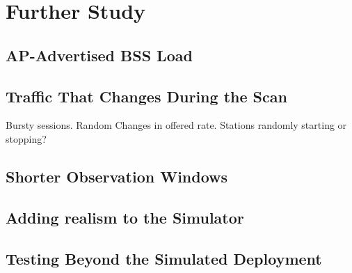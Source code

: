 \documentclass[conference]{IEEEtran}
\begin{document}
\section{Further Study}
\label{sec:future}

\subsection{AP-Advertised BSS Load}

\subsection{Traffic That Changes During the Scan}

Bursty sessions. Random Changes in offered rate. Stations randomly starting or stopping?

\subsection{Shorter Observation Windows}

\subsection{Adding realism to the Simulator}

\subsection{Testing Beyond the Simulated Deployment}
\end{document}

